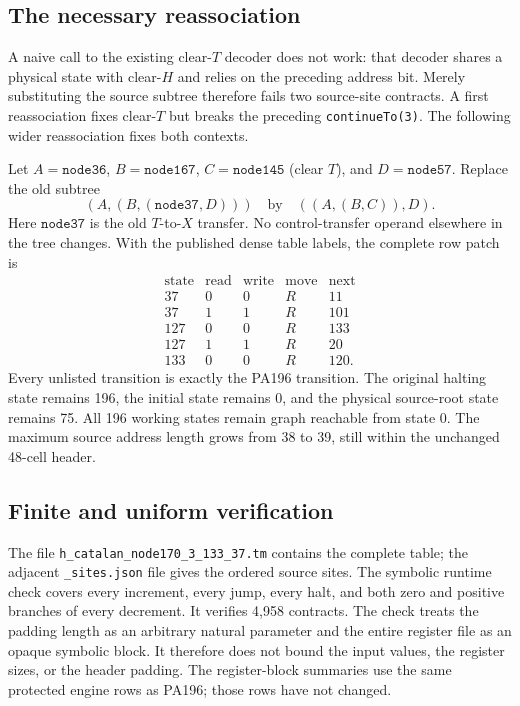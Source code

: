 \subsection{The necessary reassociation}
A naive call to the existing clear-$T$ decoder does not work: that decoder
shares a physical state with clear-$H$ and relies on the preceding address
bit.  Merely substituting the source subtree therefore fails two source-site
contracts.  A first reassociation fixes clear-$T$ but breaks the preceding
\texttt{continueTo(3)}.  The following wider reassociation fixes both contexts.

Let $A=\texttt{node36}$, $B=\texttt{node167}$,
$C=\texttt{node145}$ (clear $T$), and $D=\texttt{node57}$.
Replace the old subtree
\[
  (A,(B,(\texttt{node37},D)))
\quad\text{by}\quad
  ((A,(B,C)),D).
\]
Here $\texttt{node37}$ is the old $T$-to-$X$ transfer.  No control-transfer
operand elsewhere in the tree changes.  With the published dense table
labels, the complete row patch is
\[
\begin{array}{cc|ccc}
\text{state}&\text{read}&\text{write}&\text{move}&\text{next}\\\hline
37&0&0&R&11\\
37&1&1&R&101\\
127&0&0&R&133\\
127&1&1&R&20\\
133&0&0&R&120.
\end{array}
\]
Every unlisted transition is exactly the PA196 transition.  The original
halting state remains 196, the initial state remains 0, and the physical
source-root state remains 75.  All 196 working states remain graph reachable
from state 0.  The maximum source address length grows from 38 to 39, still
within the unchanged 48-cell header.

\subsection{Finite and uniform verification}
The file \texttt{h\_catalan\_node170\_3\_133\_37.tm} contains the complete table;
the adjacent \texttt{\_sites.json} file gives the ordered source sites.
The symbolic runtime check covers every increment, every jump, every halt,
and both zero and positive branches of every decrement.  It verifies 4,958
contracts.  The check treats the padding length as an arbitrary natural
parameter and the entire register file as an opaque symbolic block.  It
therefore does not bound the input values, the register sizes, or the header
padding.  The register-block summaries use the same protected engine rows as
PA196; those rows have not changed.

